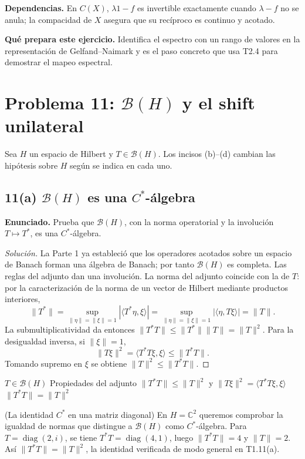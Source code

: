 \noindent\textbf{Dependencias.} En $C(X)$, $\lambda1-f$ es invertible exactamente cuando $\lambda-f$ no se anula; la compacidad de $X$ asegura que su recíproco es continuo y acotado.

\noindent\textbf{Qué prepara este ejercicio.} Identifica el espectro con un rango de valores en la representación de Gelfand--Naimark y es el paso concreto que usa T2.4 para demostrar el mapeo espectral.

\pagebreak
\section{Problema 11: $\mathcal B(H)$ y el shift unilateral}

Sea $H$ un espacio de Hilbert y $T\in\mathcal B(H)$. Los incisos (b)--(d) cambian las hipótesis
sobre $H$ según se indica en cada uno.

\subsection*{11(a) $\mathcal B(H)$ es una $C^*$-álgebra}

\noindent\textbf{Enunciado.} Prueba que $\mathcal B(H)$, con la norma operatorial y la involución $T\mapsto T^*$, es una $C^*$-álgebra.

\begin{proof}[Solución]
La Parte 1 ya estableció que los operadores acotados sobre un espacio de Banach forman una álgebra
de Banach; por tanto $\mathcal B(H)$ es completa. Las reglas del adjunto dan una involución.
La norma del adjunto coincide con la de $T$: por la caracterización de la norma de un vector de
Hilbert mediante productos interiores,
\[
 \|T^*\|=\sup_{\|\eta\|=\|\xi\|=1}|\langle T^*\eta,\xi\rangle|
 =\sup_{\|\eta\|=\|\xi\|=1}|\langle\eta,T\xi\rangle|=\|T\|.
\]
La submultiplicatividad da entonces $\|T^*T\|\le\|T^*\|\|T\|=\|T\|^2$.
Para la desigualdad inversa, si $\|\xi\|=1$,
\[
\|T\xi\|^2=\langle T^*T\xi,\xi\rangle\le\|T^*T\|.
\]
Tomando supremo en $\xi$ se obtiene $\|T\|^2\le\|T^*T\|$.
\end{proof}

\proofdiagram
{$T\in\mathcal B(H)$}
{Propiedades del adjunto}
{$\|T^*T\|\le\|T\|^2$ y $\|T\xi\|^2=\langle T^*T\xi,\xi\rangle$}
{$\|T^*T\|=\|T\|^2$}

\begin{cthejemplo}{(La identidad $C^*$ en una matriz diagonal)}
En $H=\mathbb C^2$ queremos comprobar la igualdad de normas que distingue a
$\mathcal B(H)$ como $C^*$-álgebra.
Para $T=\operatorname{diag}(2,i)$, se tiene
$T^*T=\operatorname{diag}(4,1)$, luego $\|T^*T\|=4$ y $\|T\|=2$.
Así $\|T^*T\|=\|T\|^2$, la identidad verificada de modo general en T1.11(a).
\end{cthejemplo}


